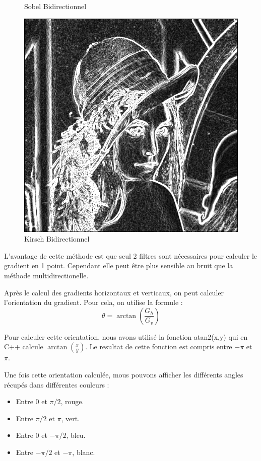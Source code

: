 \documentclass[11pt]{article}
\begin{document}
\begin{figure}[H]
\begin{minipage}[c]{.3\linewidth}
			\caption{Sobel Bidirectionnel}
			\label{fig:SobelBidirectionnel}
		\end{minipage}\hfill
		\begin{minipage}[c]{.3\linewidth}
		\centering
		\includegraphics[scale=0.25]{Image/filtreKirschBidirectionnel.png}
		\caption{Kirsch Bidirectionnel}
		\label{fig:KirschBidirectionnel}
		\end{minipage}
	\end{figure}

	L’avantage de cette méthode est que seul 2 filtres sont nécessaires pour calculer le gradient en 1 point. 
	Cependant elle peut être plus sensible au bruit que la méthode multidirectionelle.

	Après le calcul des gradients horizontaux et verticaux, on peut calculer l'orientation du gradient.
	Pour cela, on utilise la formule :
	$$
		\theta = \arctan(\frac{G_{h}}{G_{v}})
	$$

	Pour calculer cette orientation, nous avons utilisé la fonction atan2(x,y)	qui en C++ calcule $\arctan(\frac{x}{y})$. 
	Le resultat de cette fonction est compris entre $-\pi$ et $\pi$.

	Une fois cette orientation calculée, mous pouvons afficher les différents angles récupés dans différentes couleurs :
	\begin{itemize}
	\item Entre 0 et $\pi/2$, rouge.
	\item Entre $\pi/2$ et $\pi$, vert.
	\item Entre 0 et $-\pi/2$, bleu.
	\item Entre $-\pi/2$ et $-\pi$, blanc.
	\end{itemize}
            
\end{document}
